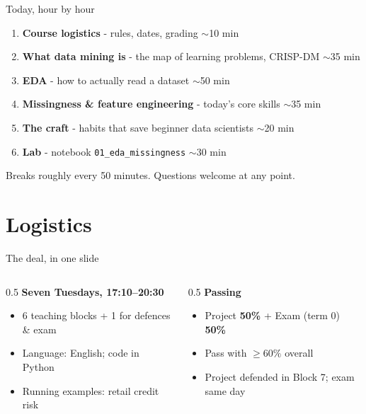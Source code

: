 \documentclass[10pt,aspectratio=169]{beamer}
\begin{document}
\begin{frame}{Today, hour by hour}
  \begin{enumerate}
    \item \textbf{Course logistics} - rules, dates, grading \hfill {\small$\sim$10 min}
    \item \textbf{What data mining is} - the map of learning problems, CRISP-DM \hfill {\small$\sim$35 min}
    \item \textbf{EDA} - how to actually read a dataset \hfill {\small$\sim$50 min}
    \item \textbf{Missingness \& feature engineering} - today's core skills \hfill {\small$\sim$35 min}
    \item \textbf{The craft} - habits that save beginner data scientists \hfill {\small$\sim$20 min}
    \item \textbf{Lab} - notebook \texttt{01\_eda\_missingness} \hfill {\small$\sim$30 min}
  \end{enumerate}
  \vspace{0.5em}
  \begin{center}\small Breaks roughly every 50 minutes. Questions welcome at any point.\end{center}
\end{frame}

\section{Logistics}

\begin{frame}{The deal, in one slide}
  \begin{columns}[T]
    \begin{column}{0.5\textwidth}
      \textbf{Seven Tuesdays, 17:10--20:30}
      \begin{itemize}\small
        \item 6 teaching blocks + 1 for defences \& exam
        \item Language: English; code in Python
        \item Running examples: \alert{retail credit risk}
      \end{itemize}
    \end{column}
    \begin{column}{0.5\textwidth}
      \textbf{Passing}
      \begin{itemize}\small
        \item Project \textbf{50\%} + Exam (term 0) \textbf{50\%}
        \item Pass with \textbf{$\geq 60\%$} overall
        \item Project defended in Block 7; exam same day
      \end{itemize}
    \end{column}
  \end{columns}
\end{frame}
\end{document}
